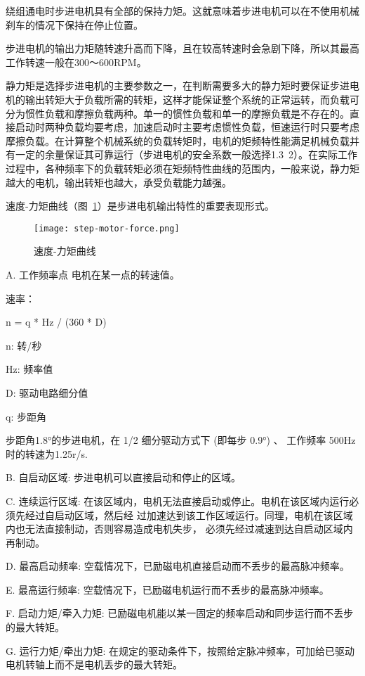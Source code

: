绕组通电时步进电机具有全部的保持力矩。这就意味着步进电机可以在不使用机械刹车的情况下保持在停止位置。

步进电机的输出力矩随转速升高而下降，且在较高转速时会急剧下降，所以其最高工作转速一般在300～600RPM。

静力矩是选择步进电机的主要参数之一，在判断需要多大的静力矩时要保证步进电机的输出转矩大于负载所需的转矩，这样才能保证整个系统的正常运转，而负载可分为惯性负载和摩擦负载两种。单一的惯性负载和单一的摩擦负载是不存在的。直接启动时两种负载均要考虑，加速启动时主要考虑惯性负载，恒速运行时只要考虑摩擦负载。在计算整个机械系统的负载转矩时，电机的矩频特性能满足机械负载并有一定的余量保证其可靠运行（步进电机的安全系数一般选择1.3~2）。在实际工作过程中，各种频率下的负载转矩必须在矩频特性曲线的范围内，一般来说，静力矩越大的电机，输出转矩也越大，承受负载能力越强。

速度-力矩曲线（图~\ref{fig:step-motor-force}）是步进电机输出特性的重要表现形式。

\begin{figure}[htbp]
    \centering
    \texttt{[image: step-motor-force.png]}
    \caption{速度-力矩曲线}
    \label{fig:step-motor-force}
\end{figure}

A. 工作频率点 电机在某一点的转速值。

速率：

n = q * Hz / (360 * D)

n: 转/秒

Hz: 频率值

D: 驱动电路细分值

q: 步距角

步距角1.8°的步进电机，在 1/2 细分驱动方式下 (即每步 0.9°) 、 工作频率 500Hz 时的转速为1.25r/s.

B. 自启动区域: 步进电机可以直接启动和停止的区域。

C. 连续运行区域: 在该区域内，电机无法直接启动或停止。电机在该区域内运行必须先经过自启动区域，然后经 过加速达到该工作区域运行。同理，电机在该区域内也无法直接制动，否则容易造成电机失步， 必须先经过减速到达自启动区域内再制动。

D. 最高启动频率: 空载情况下，已励磁电机直接启动而不丢步的最高脉冲频率。

E. 最高运行频率: 空载情况下，已励磁电机运行而不丢步的最高脉冲频率。

F. 启动力矩/牵入力矩: 已励磁电机能以某一固定的频率启动和同步运行而不丢步的最大转矩。

G. 运行力矩/牵出力矩: 在规定的驱动条件下，按照给定脉冲频率，可加给已驱动电机转轴上而不是电机丢步的最大转矩。

